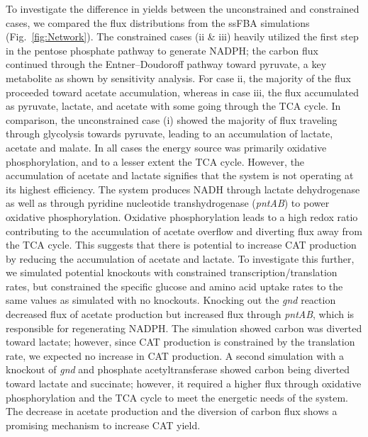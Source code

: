 \documentclass[12pt]{article}
\begin{document}
To investigate the difference in yields between the unconstrained and constrained cases, we compared the flux distributions from the ssFBA simulations (Fig.~\ref{fig:Network}).
The constrained cases (ii \& iii) heavily utilized the first step in the pentose phosphate pathway to generate NADPH; the carbon flux continued through the Entner–Doudoroff pathway toward pyruvate, a key metabolite as shown by sensitivity analysis.
For case ii, the majority of the flux proceeded toward acetate accumulation, whereas in case iii, the flux accumulated as pyruvate, lactate, and acetate with some going through the TCA cycle.  
In comparison, the unconstrained case (i) showed the majority of flux traveling through glycolysis towards pyruvate, leading to an accumulation of lactate, acetate and malate.
In all cases the energy source was primarily oxidative phosphorylation, and to a lesser extent the TCA cycle.
However, the accumulation of acetate and lactate signifies that the system is not operating at its highest efficiency.
The system produces NADH through lactate dehydrogenase as well as through pyridine nucleotide transhydrogenase (\textit{pntAB}) to power oxidative phosphorylation.
Oxidative phosphorylation leads to a high redox ratio contributing to the accumulation of acetate overflow and diverting flux away from the TCA cycle.
This suggests that there is potential to increase CAT production by reducing the accumulation of acetate and lactate.
To investigate this further, we simulated potential knockouts with constrained transcription/translation rates, but constrained the specific glucose and amino acid uptake rates to the same values as simulated with no knockouts.
Knocking out the \textit{gnd} reaction decreased flux of acetate production but increased flux through \textit{pntAB}, which is responsible for regenerating NADPH.
The simulation showed carbon was diverted toward lactate; however, since CAT production is constrained by the translation rate, we expected no increase in CAT production.
A second simulation with a knockout of \textit{gnd} and phosphate acetyltransferase showed carbon being diverted toward lactate and succinate; however, it required a higher flux through oxidative phosphorylation and the TCA cycle to meet the energetic needs of the system.
The decrease in acetate production and the diversion of carbon flux shows a promising mechanism to increase CAT yield.
\end{document}
